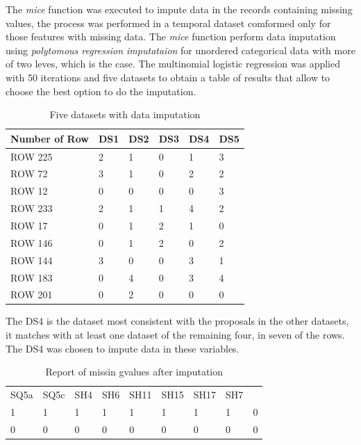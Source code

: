 \documentclass[]{book}
\begin{document}
The \emph{mice} function was executed to impute data in the records
containing missing values, the process was performed in a temporal
dataset comformed only for those features with missing data. The
\emph{mice} function perform data imputation using \emph{polytomous
regression imputataion} for unordered categorical data with more of two
leves, which is the case. The multinomial logistic regression was
applied with 50 iterations and five datasets to obtain a table of
results that allow to choose the best option to do the imputation.

\begin{table}[ht]
\centering
\caption{Five datasets with data imputation}
\label{datasets-of-impute-data}
\begin{tabular}{|l|l|l|l|l|l|}
\hline
Number of Row & DS1 & DS2 & DS3 & DS4 & DS5 \\ \hline
ROW 225       & 2   & 1   & 0   & 1   & 3   \\ \hline
ROW 72        & 3   & 1   & 0   & 2   & 2   \\ \hline
ROW 12        & 0   & 0   & 0   & 0   & 3   \\ \hline
ROW 233       & 2   & 1   & 1   & 4   & 2   \\ \hline
ROW 17        & 0   & 1   & 2   & 1   & 0   \\ \hline
ROW 146       & 0   & 1   & 2   & 0   & 2   \\ \hline
ROW 144       & 3   & 0   & 0   & 3   & 1   \\ \hline
ROW 183       & 0   & 4   & 0   & 3   & 4   \\ \hline
ROW 201       & 0   & 2   & 0   & 0   & 0   \\ \hline
\end{tabular}
\end{table}

The DS4 is the dataset most consistent with the proposals in the other
datasets, it matches with at least one dataset of the remaining four, in
seven of the rows. The DS4 was chosen to impute data in these variables.

\begin{table}[ht]
\centering
\caption{Report of missin gvalues after imputation}
\label{tab-report-of-missingvalues-after-imputation}
\begin{tabular}{lllllllll}
SQ5a & SQ5c & SH4 & SH6 & SH11 & SH15 & SH17 & SH7 &   \\
1    & 1    & 1   & 1   & 1    & 1    & 1    & 1   & 0 \\
0    & 0    & 0   & 0   & 0    & 0    & 0    & 0   & 0
\end{tabular}
\end{table}
\end{document}
